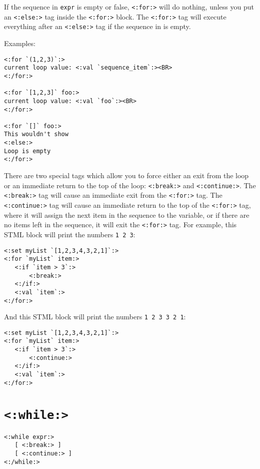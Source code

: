 \documentclass{manual}
\begin{document}
If the sequence in \texttt{expr} is empty or false, 
\texttt{<:for:>} will do nothing, unless you put 
an \texttt{<:else:>} tag inside the \texttt{<:for:>} block. 
The \texttt{<:for:>} tag will execute everything after 
an \texttt{<:else:>} tag if the sequence in 
is empty.

Examples:

\begin{verbatim}
<:for `(1,2,3)`:>
current loop value: <:val `sequence_item`:><BR>
<:/for:>

<:for `[1,2,3]` foo:> 
current loop value: <:val `foo`:><BR> 
<:/for:>

<:for `[]` foo:>
This wouldn't show
<:else:>
Loop is empty
<:/for:>
\end{verbatim}

There are two special tags which allow you to force either
an exit from the loop or an immediate return to the top of the loop:
\texttt{<:break:>} and \texttt{<:continue:>}. 
The \texttt{<:break:>} tag will
cause an immediate exit from the \texttt{<:for:>} tag.
The \texttt{<:continue:>} tag will cause an immediate return
to the top of the \texttt{<:for:>} tag, where it will
assign the next item in the sequence to the variable, or
if there are no items left in the sequence, it will exit
the \texttt{<:for:>} tag. For example, this STML block
will print the numbers \texttt{1 2 3}:

\begin{verbatim}
<:set myList `[1,2,3,4,3,2,1]`:>
<:for `myList` item:>
   <:if `item > 3`:>
       <:break:>
   <:/if:>
   <:val `item`:>
<:/for:>
\end{verbatim}

And this STML block will print the numbers 
\texttt{1 2 3 3 2 1}:

\begin{verbatim}
<:set myList `[1,2,3,4,3,2,1]`:>
<:for `myList` item:>
   <:if `item > 3`:>
       <:continue:>
   <:/if:>
   <:val `item`:>
<:/for:>
\end{verbatim}



\section{\texttt{<:while:>}}
\label{tagwhile}

\begin{verbatim}<:while expr:>
   [ <:break:> ]
   [ <:continue:> ]
<:/while:>
\end{verbatim}
\end{document}

